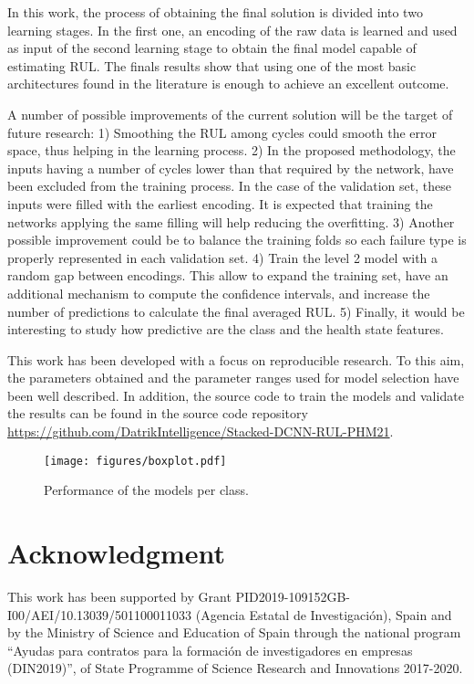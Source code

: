 \documentclass[PHM, 2021]{PHMSociety}
\begin{document}
In this work, the process of obtaining the final solution is divided into two learning stages. In the first one, an encoding of the raw data is learned and used as input of the second learning stage to obtain the final model capable of estimating RUL. The finals results show that using one of the most basic architectures found in the literature is enough to achieve an excellent outcome. 

A number of possible improvements of the current solution will be the target of future research: 1) Smoothing the RUL among cycles could smooth the error space, thus helping in the learning process. 2) In the proposed methodology, the inputs having a number of cycles lower than that required by the network, have been excluded from the training process. In the case of the validation set, these inputs were filled with the earliest encoding. It is expected that training the networks applying the same filling will help reducing the overfitting. 
3) Another possible improvement could be to balance the training folds so each failure type is properly represented in each validation set. 4) Train the level 2 model with a random gap between encodings. This allow to expand the training set, have an additional mechanism to compute the confidence intervals, and increase the number of predictions to calculate the final averaged RUL. 5) Finally, it would be interesting to study how predictive are the class and the health state features.


This work has been developed with a focus on reproducible research. To this aim, the parameters obtained and the parameter ranges used for model selection have been well described. In addition, the source code to train the models and validate the results can be found in the source code repository \href{https://github.com/DatrikIntelligence/Stacked-DCNN-RUL-PHM21}{https://github.com/DatrikIntelligence/Stacked-DCNN-RUL-PHM21}.

\begin{figure}[t]
\centering
\texttt{[image: figures/boxplot.pdf]}
\caption{Performance of the models per class.}
\label{fig:score_klass}
\end{figure}

\section*{Acknowledgment}

This work has been supported by Grant PID2019-109152GB-I00/AEI/10.13039/501100011033 (Agencia Estatal de Investigación), Spain and by the Ministry of Science and Education of Spain through the national program “Ayudas para contratos para la formación de investigadores en empresas (DIN2019)”, of State Programme of Science Research and Innovations 2017-2020.
\end{document}
